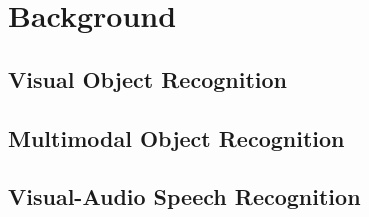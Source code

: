 \chapter{Background}\label{background}



\section{Visual Object Recognition}

\section{Multimodal Object Recognition}

\section{Visual-Audio Speech Recognition}


